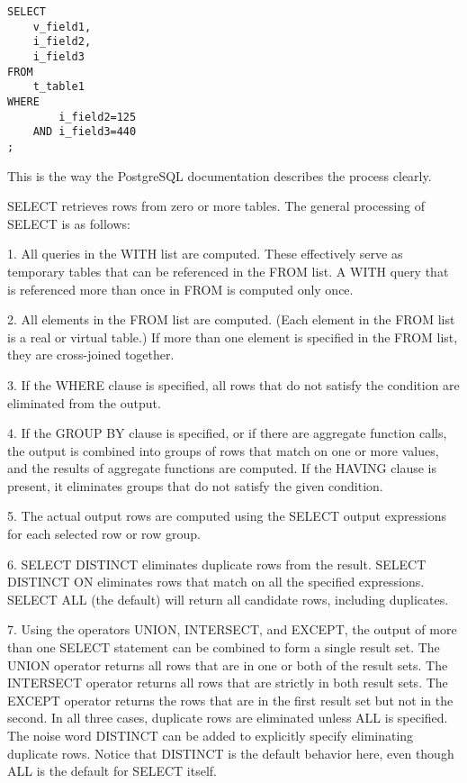 \begin{lstlisting}[style=pgsql]
SELECT 
	v_field1,
	i_field2,
	i_field3 
FROM 
	t_table1 
WHERE 
		i_field2=125
	AND	i_field3=440
;
\end{lstlisting}


This is the way the PostgreSQL documentation describes the process clearly.

\begin{smallverbatim}
 

SELECT retrieves rows from zero or more tables. The general processing of SELECT is as follows:

1. All queries in the WITH list are computed. 
These effectively serve as temporary tables that can be referenced in the FROM list. 
A WITH query that is referenced more than once in FROM is computed only once. 


2. All elements in the FROM list are computed. 
(Each element in the FROM list is a real or virtual table.) 
If more than one element is specified in the FROM list, they are cross-joined together.


3. If the WHERE clause is specified, all rows that do not satisfy the condition 
are eliminated from the output. 


4. If the GROUP BY clause is specified, or if there are aggregate function calls, 
the output is combined into groups of rows that match on one or more values, 
and the results of aggregate functions are computed. 
If the HAVING clause is present, it eliminates groups that do not satisfy the 
given condition. 


5. The actual output rows are computed using the SELECT output expressions 
for each selected row or row group. 


6. SELECT DISTINCT eliminates duplicate rows from the result. 
SELECT DISTINCT ON eliminates rows that match on all the specified expressions. 
SELECT ALL (the default) will return all candidate rows, including duplicates. 


7. Using the operators UNION, INTERSECT, and EXCEPT, the output of more than one 
SELECT statement can be combined to form a single result set. 
The UNION operator returns all rows that are in one or both of the result sets. 
The INTERSECT operator returns all rows that are strictly in both result sets. 
The EXCEPT operator returns the rows that are in the first result set but not in the second. 
In all three cases, duplicate rows are eliminated unless ALL is specified. 
The noise word DISTINCT can be added to explicitly specify eliminating duplicate rows. 
Notice that DISTINCT is the default behavior here, even though ALL is the default for SELECT itself. 



\end{smallverbatim}
